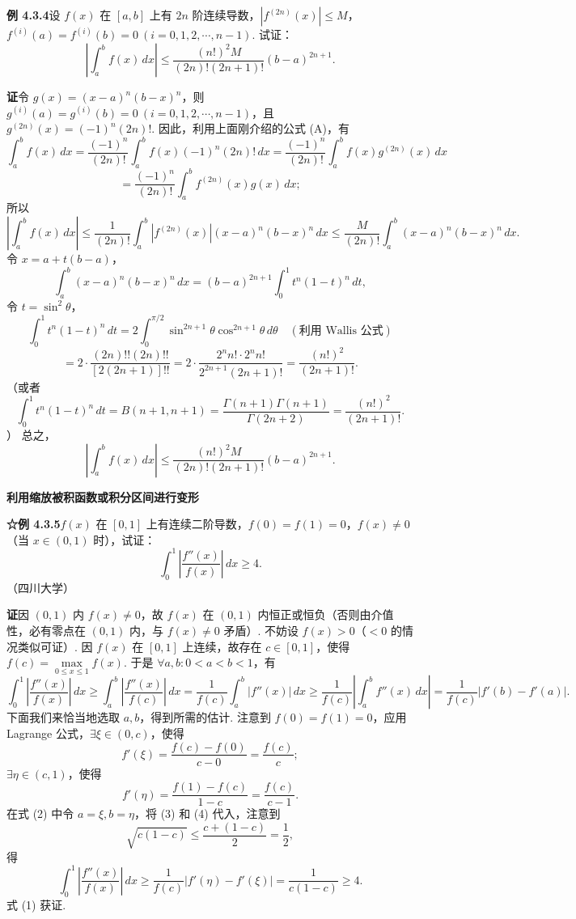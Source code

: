 \documentclass[UTF8, 12pt, fontset=fandol, oneside]{ctexart}
\begin{document}
\noindent\textbf{例 4.3.4}\quad 设 $f(x)$ 在 $[a,b]$ 上有 $2n$ 阶连续导数，$|f^{(2n)}(x)|\le M$，$f^{(i)}(a)=f^{(i)}(b)=0\ (i=0,1,2,\cdots,n-1)$. 试证：
\[
\left|\int_a^b f(x)\,dx\right|
\le\frac{(n!)^2M}{(2n)!(2n+1)!}(b-a)^{2n+1}.
\]

\noindent\textbf{证}\quad 令 $g(x)=(x-a)^n(b-x)^n$，则 $g^{(i)}(a)=g^{(i)}(b)=0\ (i=0,1,2,\cdots,n-1)$，且 $g^{(2n)}(x)=(-1)^n(2n)!$. 因此，利用上面刚介绍的公式 (A)，有
\[
\int_a^b f(x)\,dx
=\frac{(-1)^n}{(2n)!}\int_a^b f(x)(-1)^n(2n)!\,dx
=\frac{(-1)^n}{(2n)!}\int_a^b f(x)g^{(2n)}(x)\,dx
\]
\[
=\frac{(-1)^n}{(2n)!}\int_a^b f^{(2n)}(x)g(x)\,dx;
\]
所以
\[
\left|\int_a^b f(x)\,dx\right|
\le\frac1{(2n)!}\int_a^b|f^{(2n)}(x)|(x-a)^n(b-x)^n\,dx
\le\frac{M}{(2n)!}\int_a^b(x-a)^n(b-x)^n\,dx.
\]
令 $x=a+t(b-a)$，
\[
\int_a^b(x-a)^n(b-x)^n\,dx
=(b-a)^{2n+1}\int_0^1t^n(1-t)^n\,dt,
\]
令 $t=\sin^2\theta$，
\[
\int_0^1t^n(1-t)^n\,dt
=2\int_0^{\pi/2}\sin^{2n+1}\theta\cos^{2n+1}\theta\,d\theta
\quad(\text{利用 Wallis 公式})
\]
\[
=2\cdot\frac{(2n)!!(2n)!!}{[2(2n+1)]!!}
=2\cdot\frac{2^n n!\cdot2^n n!}{2^{2n+1}(2n+1)!}
=\frac{(n!)^2}{(2n+1)!}.
\]
（或者
\[
\int_0^1t^n(1-t)^n\,dt
=B(n+1,n+1)
=\frac{\Gamma(n+1)\Gamma(n+1)}{\Gamma(2n+2)}
=\frac{(n!)^2}{(2n+1)!}.
\]
）
总之，
\[
\left|\int_a^b f(x)\,dx\right|
\le\frac{(n!)^2M}{(2n)!(2n+1)!}(b-a)^{2n+1}.
\]

\noindent\textbf{利用缩放被积函数或积分区间进行变形}

\noindent\textbf{☆例 4.3.5}\quad $f(x)$ 在 $[0,1]$ 上有连续二阶导数，$f(0)=f(1)=0$，$f(x)\ne0$（当 $x\in(0,1)$ 时），试证：
\[
\int_0^1\left|\frac{f''(x)}{f(x)}\right|\,dx\ge4.
\tag{1}
\]
（四川大学）

\noindent\textbf{证}\quad 因 $(0,1)$ 内 $f(x)\ne0$，故 $f(x)$ 在 $(0,1)$ 内恒正或恒负（否则由介值性，必有零点在 $(0,1)$ 内，与 $f(x)\ne0$ 矛盾）. 不妨设 $f(x)>0$（$<0$ 的情况类似可证）. 因 $f(x)$ 在 $[0,1]$ 上连续，故存在 $c\in[0,1]$，使得 $f(c)=\max\limits_{0\le x\le1}f(x)$. 于是 $\forall a,b:0<a<b<1$，有
\[
\int_0^1\left|\frac{f''(x)}{f(x)}\right|\,dx
\ge\int_a^b\left|\frac{f''(x)}{f(c)}\right|\,dx
=\frac1{f(c)}\int_a^b|f''(x)|\,dx
\ge\frac1{f(c)}\left|\int_a^b f''(x)\,dx\right|
=\frac1{f(c)}|f'(b)-f'(a)|.
\tag{2}
\]
下面我们来恰当地选取 $a,b$，得到所需的估计. 注意到 $f(0)=f(1)=0$，应用 Lagrange 公式，$\exists\xi\in(0,c)$，使得
\[
f'(\xi)=\frac{f(c)-f(0)}{c-0}=\frac{f(c)}c;
\tag{3}
\]
$\exists\eta\in(c,1)$，使得
\[
f'(\eta)=\frac{f(1)-f(c)}{1-c}=\frac{f(c)}{c-1}.
\tag{4}
\]
在式 (2) 中令 $a=\xi,b=\eta$，将 (3) 和 (4) 代入，注意到
\[
\sqrt{c(1-c)}\le\frac{c+(1-c)}2=\frac12,
\]
得
\[
\int_0^1\left|\frac{f''(x)}{f(x)}\right|\,dx
\ge\frac1{f(c)}|f'(\eta)-f'(\xi)|
=\frac1{c(1-c)}\ge4.
\]
式 (1) 获证.
\end{document}
